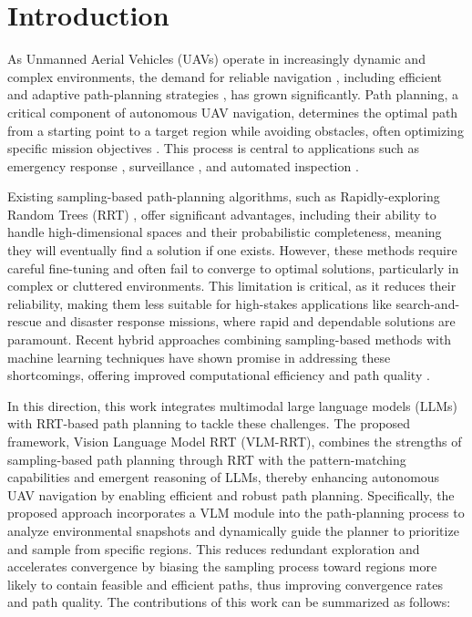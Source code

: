 \section{Introduction} 
\label{sec:Introduction}

As Unmanned Aerial Vehicles (UAVs) operate in increasingly dynamic and complex environments, the demand for reliable navigation \cite{vitale2022autonomous}, including efficient and adaptive path-planning strategies \cite{vitale2024probabilistically}, has grown significantly. Path planning, a critical component of autonomous UAV navigation, determines the optimal path from a starting point to a target region while avoiding obstacles, often optimizing specific mission objectives \cite{lavalle2006planning,papaioannou2023distributed,10925885,papaioannou2025rolling}. This process is central to applications such as emergency response \cite{wan2022accurate, papaioannou20213d, papaioannou2021towards,papaioannou2020coordinated,papaioannou2024synergising}, surveillance \cite{papaioannou2022distributed,wu2020cooperative, papaioannou2019probabilistic, papaioannou2020cooperative,papaioannou2023joint}, and automated inspection \cite{jing2020multi, sun2022automating,papaioannou2022uav,PAPAIOANNOU2024532,papaioannou2023cooperative,papaioannou2023unscented}.

Existing sampling-based path-planning algorithms, such as Rapidly-exploring Random Trees (RRT) \cite{lavalle1998rapidly, kuffner2000rrt}, offer significant advantages, including their ability to handle high-dimensional spaces and their probabilistic completeness, meaning they will eventually find a solution if one exists. However, these methods require careful fine-tuning and often fail to converge to optimal solutions, particularly in complex or cluttered environments. This limitation is critical, as it reduces their reliability, making them less suitable for high-stakes applications like search-and-rescue and disaster response missions, where rapid and dependable solutions are paramount. Recent hybrid approaches combining sampling-based methods with machine learning techniques have shown promise in addressing these shortcomings, offering improved computational efficiency and path quality \cite{arslan2015machine, wang2021deep, kuo2018deep}.

In this direction, this work integrates multimodal large language models (LLMs) with RRT-based path planning to tackle these challenges. The proposed framework, Vision Language Model RRT (VLM-RRT), combines the strengths of sampling-based path planning through RRT with the pattern-matching capabilities and emergent reasoning of LLMs, thereby enhancing autonomous UAV navigation by enabling efficient and robust path planning. Specifically, the proposed approach incorporates a VLM module into the path-planning process to analyze environmental snapshots and dynamically guide the planner to prioritize and sample from specific regions. This reduces redundant exploration and accelerates convergence by biasing the sampling process toward regions more likely to contain feasible and efficient paths, thus improving convergence rates and path quality. The contributions of this work can be summarized as follows:

